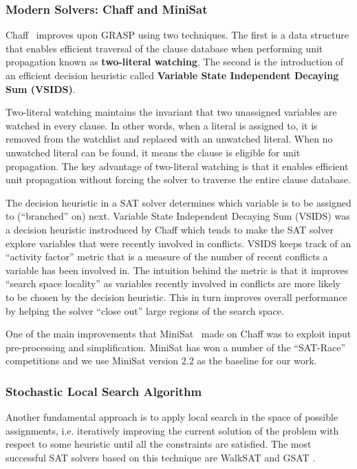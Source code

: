 \documentclass[letterpaper, compsoc, conference]{IEEEtran}
\begin{document}
\subsubsection{Modern Solvers: Chaff and MiniSat}

Chaff~\cite{Moskewicz2001Chaff} improves upon GRASP using two techniques.  The first is a
data structure that enables efficient traversal of the clause database when
performing unit propagation known as \textbf{two-literal watching}. The second
is the introduction of an efficient decision heuristic called
\textbf{Variable State Independent Decaying Sum (VSIDS)}.

Two-literal watching maintains the invariant that two unassigned variables are
watched in every clause. In other words, when a literal is assigned to, it is
removed from the watchlist and replaced with an unwatched literal. When no
unwatched literal can be found, it means the clause is eligible for unit
propagation. The key advantage of two-literal watching is that it enables
efficient unit propagation without forcing the solver to traverse the entire
clause database.

The decision heuristic in a SAT solver determines which variable is to be
assigned to (``branched'' on) next.  Variable State Independent
Decaying Sum (VSIDS) was a decision heuristic instroduced by Chaff which tends
to make the SAT solver explore variables that were recently involved in
conflicts. VSIDS keeps track of an ``activity factor'' metric that is a measure
of the number of recent conflicts a variable has been involved in.  The
intuition behind the metric is that it improves ``search space locality'' as
variables recently involved in conflicts are more likely to be chosen by the
decision heuristic.  This in turn improves overall performance by helping the
solver ``close out'' large regions of the search space.

One of the main improvements that MiniSat~\cite{MiniSat} made on Chaff was to
exploit input pre-processing and simplification. MiniSat has won a number of
the ``SAT-Race'' competitions and we use MiniSat version 2.2 as the baseline
for our work.

\subsubsection{Stochastic Local Search Algorithm}
Another fundamental approach is to apply local search in the space of possible
assignments, i.e. iteratively improving the current solution of the
problem with respect to some heuristic until all the constraints are satisfied.
The most successful SAT solvers based on this technique are WalkSAT
\cite{Selman95localsearch} and GSAT \cite{Selman1992}.
\end{document}
